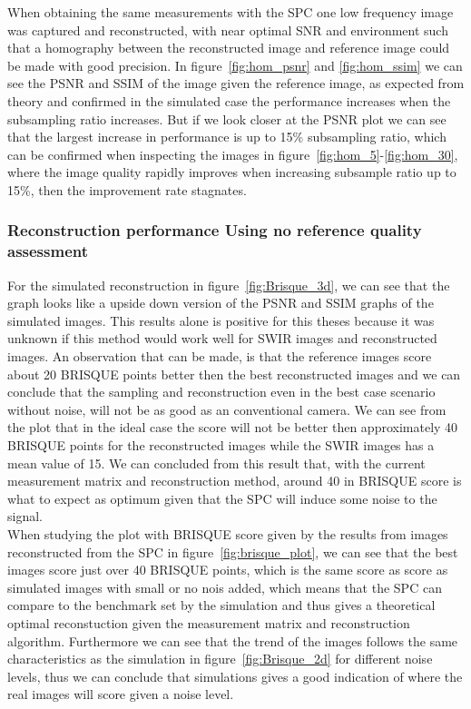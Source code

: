 When obtaining the same measurements with the SPC one low frequency image was captured and reconstructed, with near optimal SNR and environment such that a homography between the reconstructed image and reference image could be made with good precision. In figure~\ref{fig:hom_psnr} and \ref{fig:hom_ssim} we can see the PSNR and SSIM of the image given the reference image, as expected from theory and confirmed in the simulated case the performance increases when the subsampling ratio increases. But if we look closer at the PSNR plot we can see that the largest increase in performance is up to 15\% subsampling ratio, which can be confirmed when inspecting the images in figure~\ref{fig:hom_5}-\ref{fig:hom_30}, where the image quality rapidly improves when increasing subsample ratio up to 15\%, then the improvement rate stagnates.


\subsubsection{Reconstruction performance Using no reference quality assessment}
For the simulated reconstruction in figure~\ref{fig:Brisque_3d}, we can see that the graph looks like a upside down version of the PSNR and SSIM graphs of the simulated images. This results alone is positive for this theses because it was unknown if this method would work well for SWIR images and reconstructed images. An observation that can be made, is that the reference images score about 20 BRISQUE points better then the best reconstructed images and we can conclude that the sampling and reconstruction even in the best case scenario without noise, will not be as good as an conventional camera. We can see from the plot that in the ideal case the score will not be better then approximately 40 BRISQUE points for the reconstructed images while the SWIR images has a mean value of 15. We can concluded from this result that, with the current measurement matrix and reconstruction method, around 40 in BRISQUE score is what to expect as optimum given that the SPC will induce some noise to the signal.\\[0.1in]


When studying the plot with BRISQUE score given by the results from images reconstructed from the SPC in figure~\ref{fig:brisque_plot}, we can see that the best images score just over 40 BRISQUE points, which is the same score as score as simulated images with small or no nois added, which means that the SPC can compare to the benchmark set by the simulation and thus gives a theoretical optimal reconstuction given the measurement matrix and reconstruction algorithm. Furthermore we can see that the trend of the images follows the same characteristics as the simulation in figure~\ref{fig:Brisque_2d} for different noise levels, thus we can conclude that simulations gives a good indication of where the real images will score given a noise level.\\[0.1in]

